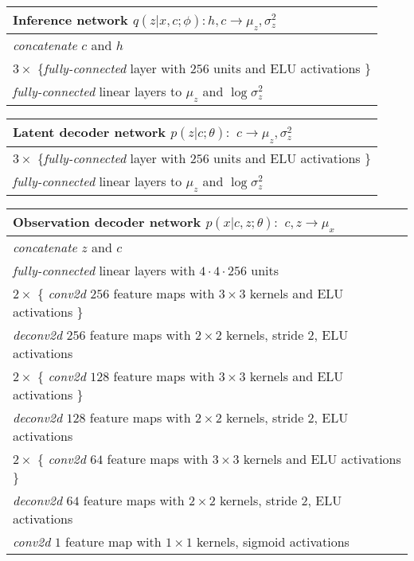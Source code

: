 \documentclass{article} \usepackage{iclr2017_conference,times}
\begin{document}
\begin{table}[H]

    \begin{tabular}{  l}
    \bf{Inference network} $q(z | x,c ; \phi): h,c \to \mu_z, \sigma^2_z$ \\ \hline
    \emph{concatenate} $c$ and $h$ \\
    $3 \times$ \{\emph{fully-connected} layer with $256$ units and ELU activations \}\\
    \emph{fully-connected} linear layers to $\mu_z$ and $\log \sigma^2_z$
\label{table:omniglot_inference_network}
    \end{tabular}
\end{table}
\begin{table}[H]

    \begin{tabular}{  l}
    \bf{Latent decoder network} $p(z | c; \theta):$ $c \to \mu_z, \sigma^2_z$ \\ \hline
    $3 \times$ \{\emph{fully-connected} layer with $256$ units and ELU activations \}\\
    \emph{fully-connected} linear layers to $\mu_z$ and $\log \sigma^2_z$
\label{table:omniglot_latent_decoder_network}
    \end{tabular}   
\end{table}

\begin{table}[H]

    \begin{tabular}{  l}
    \bf{Observation decoder network} $p(x | c, z ; \theta):$ $c,z \to \mu_x$ \\ \hline
    \emph{concatenate} $z$ and $c$ \\
    \emph{fully-connected} linear layers with $4 \cdot 4 \cdot 256$ units \\
    $2 \times$ \{ \emph{conv2d} $256$ feature maps with $3 \times 3$ kernels and ELU activations \} \\
    \emph{deconv2d} $256$ feature maps with $2 \times 2$ kernels, stride 2, ELU activations \\
     $2 \times$ \{ \emph{conv2d} $128$ feature maps with $3 \times 3$ kernels and ELU activations \} \\
    \emph{deconv2d} $128$ feature maps with $2 \times 2$ kernels, stride 2, ELU activations \\   
    $2 \times$ \{ \emph{conv2d} $64$ feature maps with $3 \times 3$ kernels and ELU activations \} \\
    \emph{deconv2d} $64$ feature maps with $2 \times 2$ kernels, stride 2, ELU activations \\
    \emph{conv2d} $1$ feature map with $1 \times 1$ kernels, sigmoid activations
\label{table:omniglot_observation_decoder_network}
    \end{tabular}   
\end{table}
\end{document}
